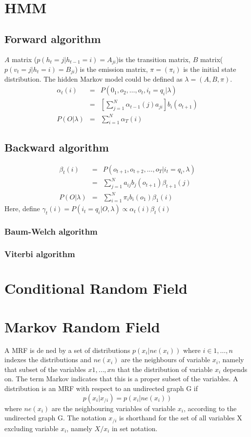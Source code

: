 \documentclass[12pt,a4paper]{article}
\begin{document}
\section*{HMM}
\subsection*{Forward algorithm}
$A$ matrix ($p(h_t=j|h_{t-1}=i)=A_{ji}$)is the transition matrix, $B$ matrix($p(v_t=j|h_t=i)=B_{ji}$) is the emission matrix, $\pi=(\pi_i)$ is the initial state distribution. The hidden Markov model could be defined as $\lambda=(A,B,\pi)$.
\begin{eqnarray*}
\alpha_t(i) &=& P(0_1,o_2,\ldots,o_t,i_t=q_i|\lambda) \\
&=& [\sum_{j=1}^{N}\alpha_{t-1}(j)a_{ji}]b_i(o_{t+1}) \\
P(O|\lambda) &=& \sum_{i=1}^{N}\alpha_{T}(i)
\end{eqnarray*}
\subsection*{Backward algorithm}
\begin{eqnarray*}
\beta_t(i) &=& P(o_{t+1},o_{t+2},\ldots,o_T|i_t=q_i,\lambda)\\
 &=& \sum_{j=1}^{N}a_{ij}b_j(o_{t+1})\beta_{t+1}(j)\\
 P(O|\lambda) &=& \sum_{i=1}^{N}\pi_ib_i(o_1)\beta_1(i)
\end{eqnarray*}
Here, define $\gamma_t(i)=P(i_t=q_i|O,\lambda)\propto \alpha_t(i)\beta_t(i)$

\subsubsection*{Baum-Welch algorithm}
\subsubsection*{Viterbi algorithm}
\section{Conditional Random Field}
\section{Markov Random Field}
A MRF is de ned by a set of distributions $p(x_i|ne(x_i))$ where $i\in{1,\ldots,n}$ indexes the distributions and $ne (x_i)$ are the neighbours of variable $x_i$, namely that subset of the variables $x1,\ldots,xn$ that the distribution of variable $x_i$ depends on. The term Markov indicates that this is a proper subset of the variables. A distribution is an MRF with respect to an undirected graph G if 
$$
p(x_i|x_{/i} ) = p(x_i|ne(x_i))
$$ 
where $ne(x_i)$ are the neighbouring variables of variable $x_i$, according to the undirected graph G. The notation $x_{/i}$ is shorthand for the set of all variables X excluding variable $x_i$, namely $X/x_i$ in set notation. 
\end{document}
